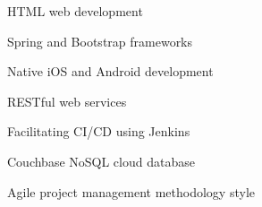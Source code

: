 \begin{tightemize}
    \item HTML web development
    \item Spring and Bootstrap frameworks
    \item Native iOS and Android development
    \item RESTful web services
    \item Facilitating CI/CD using Jenkins
    \item Couchbase NoSQL cloud database
    \item Agile project management methodology style
\end{tightemize}